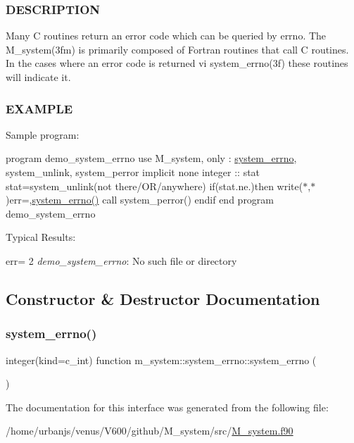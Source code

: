 \subsubsection*{D\+E\+S\+C\+R\+I\+P\+T\+I\+ON}

Many C routines return an error code which can be queried by errno. The M\+\_\+system(3fm) is primarily composed of Fortran routines that call C routines. In the cases where an error code is returned vi system\+\_\+errno(3f) these routines will indicate it.

\subsubsection*{E\+X\+A\+M\+P\+LE}

Sample program\+:

program demo\+\_\+system\+\_\+errno use M\+\_\+system, only \+: \mbox{\hyperlink{interfacem__system_1_1system__errno}{system\+\_\+errno}}, system\+\_\+unlink, system\+\_\+perror implicit none integer \+:\+: stat stat=system\+\_\+unlink(\textquotesingle{}not there/\+O\+R/anywhere\textquotesingle{}) if(stat.\+ne.)then write($\ast$,$\ast$)\textquotesingle{}err=\textquotesingle{},\mbox{\hyperlink{interfacem__system_1_1system__errno_a6450910dca7e89b71a84745d95a52d79}{system\+\_\+errno()}} call system\+\_\+perror(\textquotesingle{}) endif end program demo\+\_\+system\+\_\+errno

Typical Results\+:

err= 2 {\itshape demo\+\_\+system\+\_\+errno}\+: No such file or directory 

\subsection{Constructor \& Destructor Documentation}
\mbox{\label{interfacem__system_1_1system__errno_a6450910dca7e89b71a84745d95a52d79}} 
\subsubsection{\texorpdfstring{system\+\_\+errno()}{system\_errno()}}
{\footnotesize\ttfamily integer(kind=c\+\_\+int) function m\+\_\+system\+::system\+\_\+errno\+::system\+\_\+errno (\begin{DoxyParamCaption}{ }\end{DoxyParamCaption})\hspace{0.3cm}{\ttfamily [private]}}



The documentation for this interface was generated from the following file\+:\begin{DoxyCompactItemize}
\item 
/home/urbanjs/venus/\+V600/github/\+M\+\_\+system/src/\mbox{\hyperlink{M__system_8f90}{M\+\_\+system.\+f90}}\end{DoxyCompactItemize}
